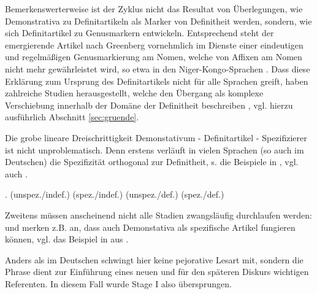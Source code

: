 Bemerkenswerterweise ist der Zyklus nicht das Resultat von Überlegungen, wie Demonstrativa zu Definitartikeln als Marker von Definitheit werden, sondern, wie sich Definitartikel zu Genusmarkern entwickeln. Entsprechend steht der emergierende Artikel nach Greenberg vornehmlich im Dienste einer eindeutigen und regelmäßigen Genusmarkierung am Nomen, welche von Affixen am Nomen nicht mehr gewährleistet wird, so etwa in den Niger-Kongo-Sprachen \parencite[55, 62]{Greenberg1978}. Dass diese Erklärung zum Ursprung des Definitartikels nicht für alle Sprachen greift, haben zahlreiche Studien herausgestellt, welche den Übergang als komplexe Verschiebung innerhalb der Domäne der Definitheit beschreiben \parencite[z.B.][]{Himmelmann1997,Lyons1999,Leiss2000,Demske2001}, vgl. hierzu ausführlich Abschnitt \ref{sec:gruende}.

Die grobe lineare Dreischrittigkeit Demonstativum - Definitartikel - Spezifizierer ist nicht unproblematisch. Denn erstens verläuft in vielen Sprachen (so auch im Deutschen) die Spezifizität orthogonal zur Definitheit, s. die Beispiele in  \parencite[in Adaption an][245]{Studler2011}, vgl. auch \textcite{Lyons1999}. 

\begin{exe}
	\ex \label{ex:spez-ortho}   
	\begin{xlist}
		\ex \label{ex:kleid1} .  (unspez./indef.) 
		\ex \label{ex:kleid2}  (spez./indef.)
		\ex \label{ex:stud1}  (unspez./def.)
		\ex \label{ex:stud2}  (spez./def.)
		\end{xlist}
\end{exe}

\noindent 
Zweitens müssen anscheinend nicht alle Stadien zwangsläufig durchlaufen werden: \textcite[107]{Himmelmann1997} und \textcite[139]{Diessel1999} merken z.B. an, dass auch Demonstativa als spezifische Artikel fungieren können, vgl. das Beispiel in  aus \textcite[533]{deMulder2011}. 
\begin{exe}
	\ex \label{ex:guy}   
\end{exe}
\noindent 
Anders als im Deutschen schwingt hier keine pejorative Lesart mit, sondern die Phrase  dient zur Einführung eines neuen und für den späteren Diskurs wichtigen Referenten. In diesem Fall wurde Stage I also übersprungen. 

